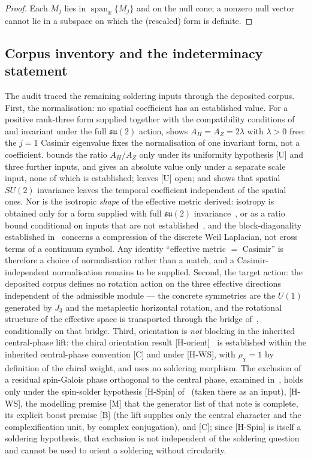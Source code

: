 \documentclass[11pt,a4paper]{article}
\begin{document}
\begin{proof}
Each $M_j$ lies in $\operatorname{span}_{\mathbb{R}}\{M_j\}$ and on the null cone; a nonzero null vector
cannot lie in a subspace on which the (rescaled) form is definite.
\end{proof}

\subsection{Corpus inventory and the indeterminacy statement}
\label{sec:indeterminacy}

The audit traced the remaining soldering inputs through the deposited corpus.
First, the normalisation: no spatial coefficient has an established value.
For a positive rank-three form supplied together with the compatibility conditions of~\cite{Beau2026q7}
and invariant under the full $\mathfrak{su}(2)$ action, \cite{BeauQ8} shows $A_H = A_Z = 2\lambda$ with $\lambda > 0$ free: the $j = 1$ Casimir eigenvalue fixes
the normalisation of one invariant form, not a coefficient.
\cite{Beau2026q10} bounds the ratio $A_H/A_Z$ only under its uniformity hypothesis [U] and three further
inputs, and gives an absolute value only under a separate scale input, none of which is established;
\cite{Beau2026u1} leaves [U] open; and \cite{Beau2026q11} shows that spatial $SU(2)$ invariance leaves the
temporal coefficient independent of the spatial ones.
Nor is the isotropic \emph{shape} of the effective metric derived: isotropy is obtained only for a form
supplied with full $\mathfrak{su}(2)$ invariance~\cite{BeauQ8}, or as a ratio bound conditional on inputs
that are not established~\cite{Beau2026q10}, and the block-diagonality established
in~\cite{Beau2026q7} concerns a compression of the discrete Weil Laplacian, not cross terms of a continuum
symbol.
Any identity ``effective metric $=$ Casimir'' is therefore a choice of normalisation rather than a match,
and a Casimir-independent normalisation remains to be supplied.
Second, the target action: the deposited corpus defines no rotation action on the three effective
directions independent of the admissible module — the concrete symmetries are the $U(1)$ generated by
$J_3$ and the metaplectic horizontal rotation, and the rotational structure of the effective space is
transported through the bridge of~\cite{Beau2026q7}, conditionally on that bridge.
Third, orientation is \emph{not} blocking in the inherited central-phase lift: the chiral orientation result
[H-orient]~\cite{Beau2026cho} is established within the inherited central-phase convention [C] and under [H-WS],
with $\rho_\chi=1$ by definition of the chiral weight, and uses no soldering morphism.
The exclusion of a residual spin-Galois phase orthogonal to the central phase, examined in~\cite{Beau2026aog}, holds
only under the spin-solder hypothesis [H-Spin] of~\cite{Beau2026q14} (taken there as an input), [H-WS], the modelling
premise [M] that the generator list of that note is complete, its explicit boost premise [B] (the lift supplies only the
central character and the complexification unit, by complex conjugation), and [C]; since [H-Spin] is itself a soldering
hypothesis, that exclusion is not independent of the soldering question and cannot be used to orient a soldering
without circularity.
\end{document}
